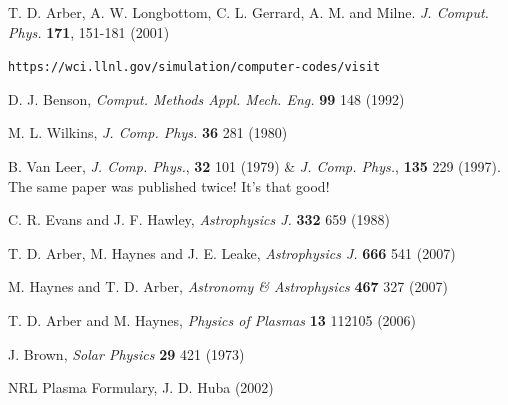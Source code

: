 \documentclass[11pt]{article}
\begin{document}
\newpage
\begin{thebibliography}{}

 T. D. Arber, A. W. Longbottom, C. L. Gerrard, A. M. and Milne. \textit{J. Comput. Phys.} \textbf{171}, 151-181 (2001)

 \texttt{https://wci.llnl.gov/simulation/computer-codes/visit}

 D. J. Benson, \textit{Comput. Methods Appl. Mech. Eng.} \textbf{99} 148 (1992)

 M. L. Wilkins, \textit{J. Comp. Phys.} \textbf{36} 281 (1980)

 B. Van Leer, \textit{J. Comp. Phys.}, \textbf{32} 101 (1979)  \& \textit{J. Comp. Phys.}, \textbf{135} 229 (1997). The same paper was published twice! It's that good!

 C. R. Evans and J. F. Hawley, \textit{Astrophysics J.} \textbf{332} 659 (1988)

 T. D. Arber, M. Haynes and J. E. Leake, {\it Astrophysics J.} \textbf{666} 541 (2007)

 M. Haynes and T. D. Arber, \textit{Astronomy \& Astrophysics } \textbf{467} 327 (2007)

 T. D. Arber and M. Haynes, \textit{Physics of Plasmas} \textbf{13} 112105 (2006)

 J. Brown, \textit{Solar Physics} \textbf{29} 421 (1973)

 NRL Plasma Formulary, J. D. Huba (2002)

\end{thebibliography}
\end{document}
